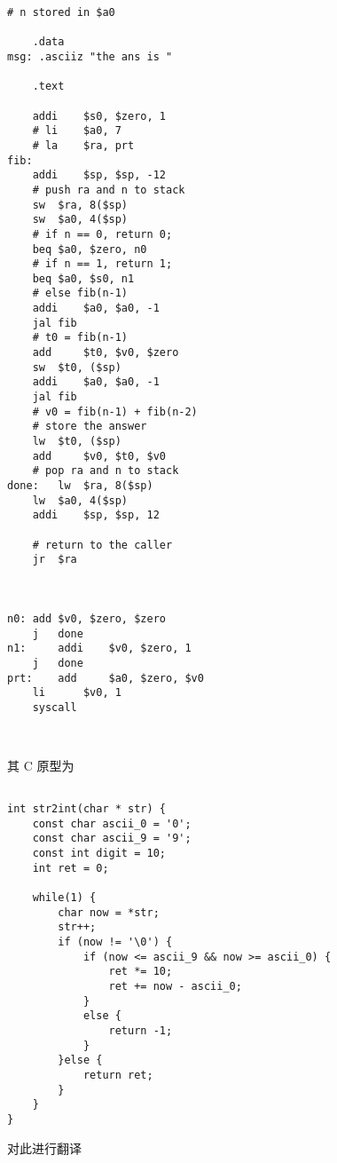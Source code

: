\documentclass[lang=cn,11pt,a4paper,cite=authoryear]{elegantpaper}
\begin{document}
\begin{lstlisting}
# n stored in $a0

	.data
msg: .asciiz "the ans is "

	.text

	addi 	$s0, $zero, 1
	# li	$a0, 7
	# la	$ra, prt
fib:	
	addi	$sp, $sp, -12
	# push ra and n to stack
	sw 	$ra, 8($sp)
	sw 	$a0, 4($sp)
	# if n == 0, return 0; 
	beq	$a0, $zero, n0
	# if n == 1, return 1;
	beq	$a0, $s0, n1
	# else fib(n-1)
	addi 	$a0, $a0, -1
	jal	fib
	# t0 = fib(n-1)
	add 	$t0, $v0, $zero
	sw 	$t0, ($sp) 
	addi 	$a0, $a0, -1
	jal	fib
	# v0 = fib(n-1) + fib(n-2)
	# store the answer
	lw	$t0, ($sp)
	add 	$v0, $t0, $v0
	# pop ra and n to stack 
done:	lw	$ra, 8($sp)
	lw	$a0, 4($sp)
	addi 	$sp, $sp, 12
	
	# return to the caller
	jr	$ra
	
	

n0:	add	$v0, $zero, $zero
	j	done 
n1: 	addi	$v0, $zero, 1
	j 	done
prt:	add 	$a0, $zero, $v0
	li      $v0, 1
	syscall 
	
	
\end{lstlisting}






其 C 原型为 

\begin{lstlisting}

int str2int(char * str) {
    const char ascii_0 = '0';
    const char ascii_9 = '9';
    const int digit = 10;
    int ret = 0;

    while(1) {
		char now = *str;
		str++;
        if (now != '\0') {
            if (now <= ascii_9 && now >= ascii_0) {
                ret *= 10;
                ret += now - ascii_0;
            }
            else {
                return -1;
            }
        }else {
            return ret;
        }
    }
} 

\end{lstlisting}

对此进行翻译
\end{document}
